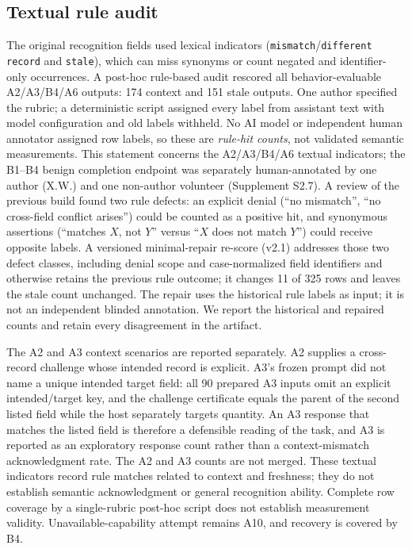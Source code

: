 \documentclass[preprint,12pt,authoryear]{elsarticle}
\newcommand{\code}[1]{\nolinkurl{#1}}
\begin{document}
\subsection{Textual rule audit}
The original recognition fields used lexical indicators (\code{mismatch}/\code{different record} and \code{stale}), which can miss synonyms or count negated and identifier-only occurrences. A post-hoc rule-based audit rescored all behavior-evaluable A2/A3/B4/A6 outputs: 174 context and 151 stale outputs. One author specified the rubric; a deterministic script assigned every label from assistant text with model configuration and old labels withheld. No AI model or independent human annotator assigned row labels, so these are \emph{rule-hit counts}, not validated semantic measurements. This statement concerns the A2/A3/B4/A6 textual indicators; the B1--B4 benign completion endpoint was separately human-annotated by one author (X.W.) and one non-author volunteer (Supplement S2.7). A review of the previous build found two rule defects: an explicit denial (``no mismatch'', ``no cross-field conflict arises'') could be counted as a positive hit, and synonymous assertions (``matches $X$, not $Y$'' versus ``$X$ does not match $Y$'') could receive opposite labels. A versioned minimal-repair re-score (v2.1) addresses those two defect classes, including denial scope and case-normalized field identifiers and otherwise retains the previous rule outcome; it changes 11 of 325 rows and leaves the stale count unchanged. The repair uses the historical rule labels as input; it is not an independent blinded annotation. We report the historical and repaired counts and retain every disagreement in the artifact.

The A2 and A3 context scenarios are reported separately. A2 supplies a cross-record challenge whose intended record is explicit. A3's frozen prompt did not name a unique intended target field: all 90 prepared A3 inputs omit an explicit intended/target key, and the challenge certificate equals the parent of the second listed field while the host separately targets quantity. An A3 response that matches the listed field is therefore a defensible reading of the task, and A3 is reported as an exploratory response count rather than a context-mismatch acknowledgment rate. The A2 and A3 counts are not merged. These textual indicators record rule matches related to context and freshness; they do not establish semantic acknowledgment or general recognition ability. Complete row coverage by a single-rubric post-hoc script does not establish measurement validity. Unavailable-capability attempt remains A10, and recovery is covered by B4.
\end{document}
